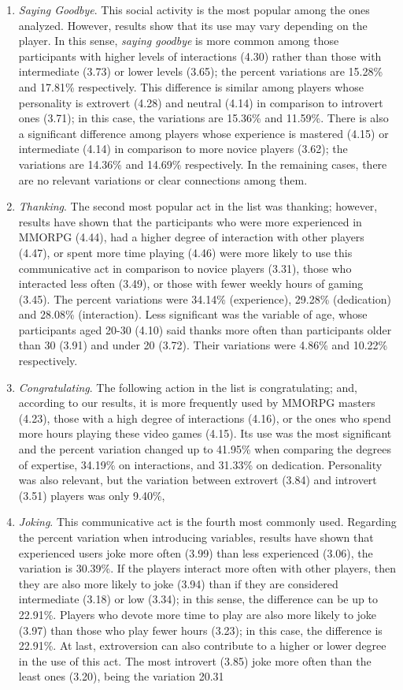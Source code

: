 \documentclass[english]{textolivre}
\begin{document}
\begin{enumerate}
\item \emph{Saying Goodbye}. This social activity is the most popular among the ones analyzed. However, results show that its use may vary depending on the player. In this sense, \emph{saying goodbye} is more common among those participants with higher levels of interactions (4.30) rather than those with intermediate (3.73) or lower levels (3.65); the percent variations are 15.28\% and 17.81\% respectively. This difference is similar among players whose personality is extrovert (4.28) and neutral (4.14) in comparison to introvert ones (3.71); in this case, the variations are 15.36\% and 11.59\%. There is also a significant difference among players whose experience is mastered (4.15) or intermediate (4.14) in comparison to more novice players (3.62); the variations are 14.36\% and 14.69\% respectively. In the remaining cases, there are no relevant variations or clear connections among them.
\item \emph{Thanking}. The second most popular act in the list was thanking; however, results have shown that the participants who were more experienced in MMORPG (4.44), had a higher degree of interaction with other players (4.47), or spent more time playing (4.46) were more likely to use this communicative act in comparison to novice players (3.31), those who interacted less often (3.49), or those with fewer weekly hours of gaming (3.45). The percent variations were 34.14\% (experience), 29.28\% (dedication) and 28.08\% (interaction). Less significant was the variable of age, whose participants aged 20-30 (4.10) said thanks more often than participants older than 30 (3.91) and under 20 (3.72). Their variations were 4.86\% and 10.22\% respectively. 
\item \emph{Congratulating}. The following action in the list is congratulating; and, according to our results, it is more frequently used by MMORPG masters (4.23), those with a high degree of interactions (4.16), or the ones who spend more hours playing these video games (4.15). Its use was the most significant and the percent variation changed up to 41.95\% when comparing the degrees of expertise, 34.19\% on interactions, and 31.33\% on dedication. Personality was also relevant, but the variation between extrovert (3.84) and introvert (3.51) players was only 9.40\%, 
\item \emph{Joking}. This communicative act is the fourth most commonly used. Regarding the percent variation when introducing variables, results have shown that experienced users joke more often (3.99) than less experienced (3.06), the variation is 30.39\%. If the players interact more often with other players, then they are also more likely to joke (3.94) than if they are considered intermediate (3.18) or low (3.34); in this sense, the difference can be up to 22.91\%. Players who devote more time to play are also more likely to joke (3.97) than those who play fewer hours (3.23); in this case, the difference is 22.91\%. At last, extroversion can also contribute to a higher or lower degree in the use of this act. The most introvert (3.85) joke more often than the least ones (3.20), being the variation 20.31%

\end{enumerate}
\end{document}
